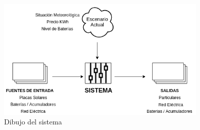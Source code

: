 \begin{figure}[!h]
	\centering
	\includegraphics[width=10cm]{figs/Abstract.png}
	\caption{Dibujo del sistema}
\end{figure}
